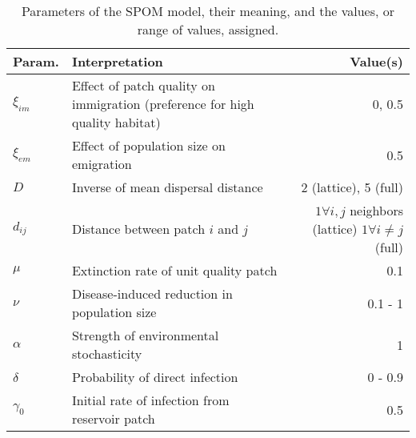 \documentclass{article}
\begin{document}
\begin{table}[h!]   
\caption{Parameters of the SPOM model, their meaning, and the values, or range of values, assigned.}
\begin{tabular}{p{1cm} p{6cm} r}
Param. & Interpretation &  Value(s) \\
\hline
$\xi_{im}$ & Effect of patch quality on immigration (preference for high quality habitat) & 0, 0.5 \\
$\xi_{em}$ & Effect of population size on emigration & 0.5  \\
$D$& Inverse of mean dispersal distance & 2 (lattice), 5 (full) \\
$d_{ij}$ & Distance between patch $i$ and $j$ & \parbox[t]{4cm}{\raggedleft $1 \forall i, j$ neighbors (lattice)\\ $1 \forall  i\neq j$ (full)}\\
\hline
$\mu$ & Extinction rate of unit quality patch & 0.1 \\
$\nu$ & Disease-induced reduction in population size & 0.1 - 1 \\
$\alpha$ & Strength of environmental stochasticity & 1 \\
\hline
$\delta$ & Probability of direct infection & 0 - 0.9 \\
$\gamma_0$ & Initial rate of infection from reservoir patch & 0.5
\end{tabular}
\label{params}
\end{table}
\end{document}
